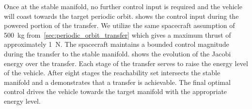 Once at the stable manifold, no further control input is required and the vehicle will coast towards the target periodic orbit.
 shows the control input during the powered portion of the transfer. 
We utilize the same spacecraft assumption of \SI{500}{\kilo\gram} from~\cref{sec:periodic_orbit_transfer} which gives a maximum thrust of approximately \SI{1}{\newton}.
The spacecraft maintains a bounded control magnitude during the transfer to the stable manifold.
 shows the evolution of the Jacobi energy over the transfer.
Each stage of the transfer serves to raise the energy level of the vehicle.
After eight stages the reachability set intersects the stable manifold and a demonstrates that a transfer is achievable.
The final optimal control drives the vehicle towards the target manifold with the appropriate energy level.
